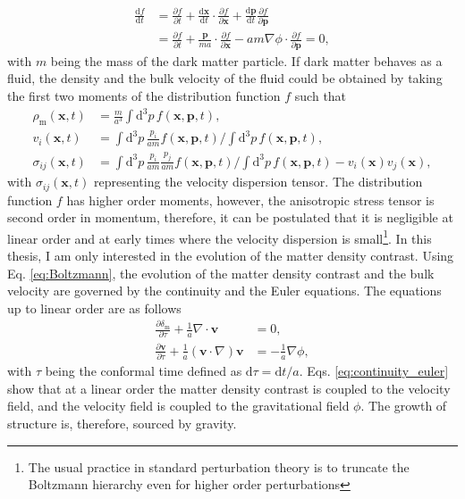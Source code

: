 \begin{equation} \label{eq:Boltzmann}
\begin{split}
    \frac{\mathrm{d}f}{\mathrm{d}t} &= \frac{\partial f}{\partial t} + \frac{\mathrm{d}\mathbf{x}}{\mathrm{d}t} \cdot \frac{\partial f}{\partial \mathbf{x}} + \frac{\mathrm{d}\mathbf{p}}{\mathrm{d}t} \frac{\partial f}{\partial \mathbf{p}}  \\
    &= \frac{\partial f}{\partial t} + \frac{\mathbf{p}}{ma} \cdot \frac{\partial f}{\partial \mathbf{x}} - am\nabla\phi \cdot \frac{\partial f}{\partial \mathbf{p}} = 0,
\end{split}
\end{equation}
with $m$ being the mass of the dark matter particle. If dark matter behaves as a fluid, the density and the bulk velocity of the fluid could be obtained by taking the first two moments of the distribution function $f$ such that 
\begin{align} 
    \rho_{\mathrm{m}}(\mathbf{x}, t) &= \frac{m}{a^3} \int \mathrm{d}^3p \, f(\mathbf{x}, \mathbf{p}, t), \label{eq:rho} \\
    v_i(\mathbf{x}, t) &= \int \mathrm{d}^3p \, \frac{p_i}{am} f(\mathbf{x}, \mathbf{p}, t) \Bigg/ \int \mathrm{d}^3p \, f(\mathbf{x}, \mathbf{p}, t), \label{eq:vi} \\
    \sigma_{ij}(\mathbf{x}, t) &= \int \mathrm{d}^3p \, \frac{p_i}{am} \frac{p_j}{am} f(\mathbf{x}, \mathbf{p}, t) \Bigg/ \int \mathrm{d}^3p \, f(\mathbf{x}, \mathbf{p}, t) - v_i(\mathbf{x}) v_j(\mathbf{x}), \label{eq:sigma}
\end{align}
with $\sigma_{ij}(\mathbf{x}, t)$ representing the velocity dispersion tensor. The distribution function $f$ has higher order moments, however, the anisotropic stress tensor is second order in momentum, therefore, it can be postulated that it is negligible at linear order and at early times where the velocity dispersion is small\footnote{The usual practice in standard perturbation theory is to truncate the Boltzmann hierarchy even for higher order perturbations}. In this thesis, I am only interested in the evolution of the matter density contrast. Using Eq. \ref{eq:Boltzmann}, the evolution of the matter density contrast and the bulk velocity are governed by the continuity and the Euler equations. The equations up to linear order are as follows
\begin{subequations} \label{eq:continuity_euler}
\begin{align}
    \frac{\partial \delta_{\mathrm{m}}}{\partial \tau} + \frac{1}{a} \nabla \cdot \mathbf{v} & = 0, \\
    \frac{\partial \mathbf{v}}{\partial \tau} + \frac{1}{a} (\mathbf{v} \cdot \nabla) \mathbf{v} &= -\frac{1}{a} \nabla \phi,
\end{align}
\end{subequations}
with $\tau$ being the conformal time defined as $\mathrm{d}\tau = \mathrm{d}t/a$. Eqs. \ref{eq:continuity_euler} show that at a linear order the matter density contrast is coupled to the velocity field, and the velocity field is coupled to the gravitational field $\phi$. The growth of structure is, therefore, sourced by gravity. 

